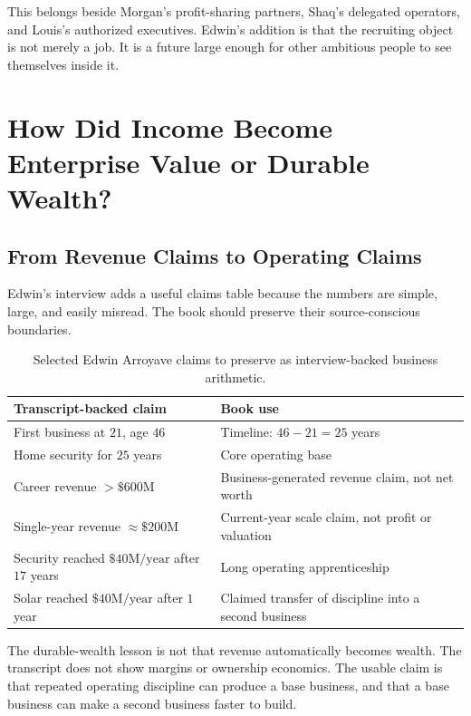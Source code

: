 \documentclass[11pt,oneside]{book}
\begin{document}
This belongs beside Morgan's profit-sharing partners, Shaq's delegated operators, and Louis's authorized executives. Edwin's addition is that the recruiting object is not merely a job. It is a future large enough for other ambitious people to see themselves inside it.

\chapter{How Did Income Become Enterprise Value or Durable Wealth?}

\section{From Revenue Claims to Operating Claims}

Edwin's interview adds a useful claims table because the numbers are simple, large, and easily misread. The book should preserve their source-conscious boundaries.

\begin{table}
\centering
\begin{tabular}{|p{.38\linewidth}|p{.46\linewidth}|}
\hline
Transcript-backed claim & Book use\\
\hline
First business at \(21\), age \(46\) & Timeline: \(46-21=25\) years\\
\hline
Home security for \(25\) years & Core operating base\\
\hline
Career revenue \(> \$600\mathrm{M}\) & Business-generated revenue claim, not net worth\\
\hline
Single-year revenue \(\approx \$200\mathrm{M}\) & Current-year scale claim, not profit or valuation\\
\hline
Security reached \(\$40\mathrm{M/year}\) after \(17\) years & Long operating apprenticeship\\
\hline
Solar reached \(\$40\mathrm{M/year}\) after \(1\) year & Claimed transfer of discipline into a second business\\
\hline
\end{tabular}
\caption{Selected Edwin Arroyave claims to preserve as interview-backed business arithmetic.}
\end{table}

The durable-wealth lesson is not that revenue automatically becomes wealth. The transcript does not show margins or ownership economics. The usable claim is that repeated operating discipline can produce a base business, and that a base business can make a second business faster to build.
\end{document}
